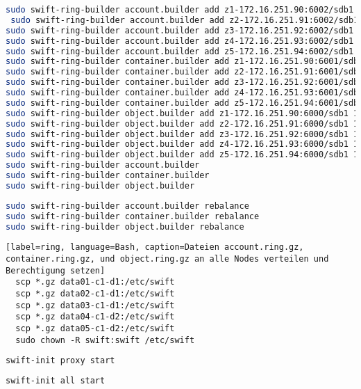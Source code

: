 \begin{lstlisting}[label=ring, language=Bash, caption=Server bzw. Speicher den Ringen hinzufügen]
sudo swift-ring-builder account.builder add z1-172.16.251.90:6002/sdb1 100
 sudo swift-ring-builder account.builder add z2-172.16.251.91:6002/sdb1 100
sudo swift-ring-builder account.builder add z3-172.16.251.92:6002/sdb1 100
sudo swift-ring-builder account.builder add z4-172.16.251.93:6002/sdb1 100
sudo swift-ring-builder account.builder add z5-172.16.251.94:6002/sdb1 100
sudo swift-ring-builder container.builder add z1-172.16.251.90:6001/sdb1 100
sudo swift-ring-builder container.builder add z2-172.16.251.91:6001/sdb1 100
sudo swift-ring-builder container.builder add z3-172.16.251.92:6001/sdb1 100
sudo swift-ring-builder container.builder add z4-172.16.251.93:6001/sdb1 100
sudo swift-ring-builder container.builder add z5-172.16.251.94:6001/sdb1 100
sudo swift-ring-builder object.builder add z1-172.16.251.90:6000/sdb1 100
sudo swift-ring-builder object.builder add z2-172.16.251.91:6000/sdb1 100
sudo swift-ring-builder object.builder add z3-172.16.251.92:6000/sdb1 100
sudo swift-ring-builder object.builder add z4-172.16.251.93:6000/sdb1 100
sudo swift-ring-builder object.builder add z5-172.16.251.94:6000/sdb1 100
sudo swift-ring-builder account.builder
sudo swift-ring-builder container.builder
sudo swift-ring-builder object.builder
\end{lstlisting}

\begin{lstlisting}[label=ring, language=Bash, caption=Ring rebalance]
sudo swift-ring-builder account.builder rebalance
sudo swift-ring-builder container.builder rebalance
sudo swift-ring-builder object.builder rebalance
\end{lstlisting}

\begin{lstlisting}[label=ring, language=Bash, caption=Dateien account.ring.gz, container.ring.gz, und object.ring.gz an alle Nodes verteilen und Berechtigung setzen]
  scp *.gz data01-c1-d1:/etc/swift
  scp *.gz data02-c1-d1:/etc/swift  
  scp *.gz data03-c1-d1:/etc/swift
  scp *.gz data04-c1-d2:/etc/swift
  scp *.gz data05-c1-d2:/etc/swift
  sudo chown -R swift:swift /etc/swift
\end{lstlisting}

\begin{lstlisting}[label=ring, language=Bash, caption=Proxy Dienst starten]
swift-init proxy start
\end{lstlisting}

\begin{lstlisting}[label=ring, language=Bash, caption=Auf allen Nodes die Dienste starten]
swift-init all start
\end{lstlisting}